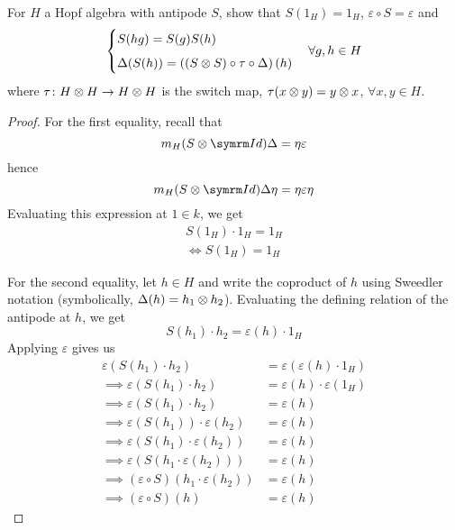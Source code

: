 \begin{exercise}
For \(H\) a Hopf algebra with antipode \(S\), show that \(S\left(1_H\right) = 1_H\), \(\varepsilon \circ S = \varepsilon\) and
\[
\begin{cases}
    S(h g) = S(g) S(h) \\[0.5em]
    \Delta (S(h)) = \left((S \otimes S) \circ \tau \circ \Delta\right) (h)
\end{cases} \forall g, h \in H
\]
where \(\tau \colon H \otimes H \to H \otimes H\) is the switch map, \(\tau (x \otimes y) = y \otimes x\), \(\forall x, y \in H\).
\end{exercise}
\begin{proof}
For the first equality, recall that
\[
    m_H (S \tensor \Id) \Delta = \eta \varepsilon
\]
hence
\[
    m_H (S \tensor \Id) \Delta \eta = \eta \varepsilon \eta
\]
Evaluating this expression at \(1 \in k\), we get
\begin{gather*}
    S\left(1_H\right) \cdot 1_H = 1_H \\
    \iff 
    S\left(1_H\right) = 1_H
\end{gather*}

For the second equality, let \(h \in H\) and write the coproduct of \(h\) using Sweedler notation (symbolically, \(\Delta(h) = h_1 \otimes h_2\)). Evaluating the defining relation of the antipode at \(h\), we get
\[
    S\left(h_1\right) \cdot h_2 = \varepsilon(h) \cdot 1_H
\]
Applying \(\varepsilon\) gives us
\begin{align*}    
    \varepsilon \left(S\left(h_1\right) \cdot h_2\right) &= \varepsilon\left(\varepsilon(h) \cdot 1_H\right) \\
    \implies
    \varepsilon \left(S\left(h_1\right) \cdot h_2\right) &= \varepsilon(h) \cdot \varepsilon\left(1_H\right) \tag{\(\varepsilon\) is \(k\)-linear} \\
    \implies
    \varepsilon\left(S(h_1) \cdot h_2\right) &= \varepsilon(h) \tag{\(\varepsilon\) is counit} \\
    \implies
    \varepsilon \left(S\left(h_1\right)\right) \cdot \varepsilon\left(h_2\right) &= \varepsilon(h) \tag{\(\varepsilon\) is a \(k\)-algebra homomorphism} \\
    \implies
    \varepsilon\left(S(h_1) \cdot \varepsilon\left(h_2\right)\right) &= \varepsilon(h) \tag{\(\varepsilon\) is \(k\)-linear} \\
    \implies
    \varepsilon\left(S\left(h_1 \cdot \varepsilon\left(h_2\right)\right)\right) &= \varepsilon(h) \tag{\(S\) is \(k\)-linear} \\
    \implies
    (\varepsilon \circ S)\left(h_1 \cdot \varepsilon\left(h_2\right)\right) &= \varepsilon(h) \\
    \implies
    (\varepsilon \circ S) (h) &= \varepsilon(h)
\end{align*}


\end{proof}
